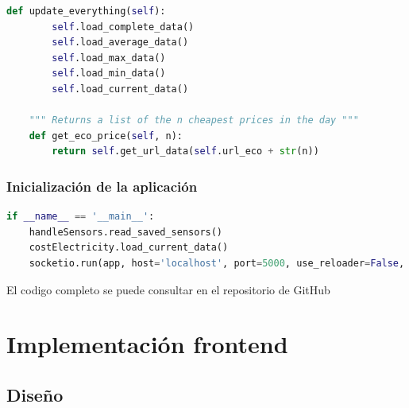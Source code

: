 \begin{titlepage}
\begin{lstlisting}[language=python]
    def update_everything(self):
        self.load_complete_data()
        self.load_average_data()
        self.load_max_data()
        self.load_min_data()
        self.load_current_data()

    """ Returns a list of the n cheapest prices in the day """
    def get_eco_price(self, n):
        return self.get_url_data(self.url_eco + str(n))

\end{lstlisting}

\subsubsection{Inicialización de la aplicación}
\begin{lstlisting}[language=python]
if __name__ == '__main__':
	handleSensors.read_saved_sensors()
	costElectricity.load_current_data()
	socketio.run(app, host='localhost', port=5000, use_reloader=False, debug=True)
\end{lstlisting}

El codigo completo se puede consultar en el repositorio de GitHub\cite{ref25}
\section{Implementación frontend}
\subsection{Diseño}

\end{titlepage}
